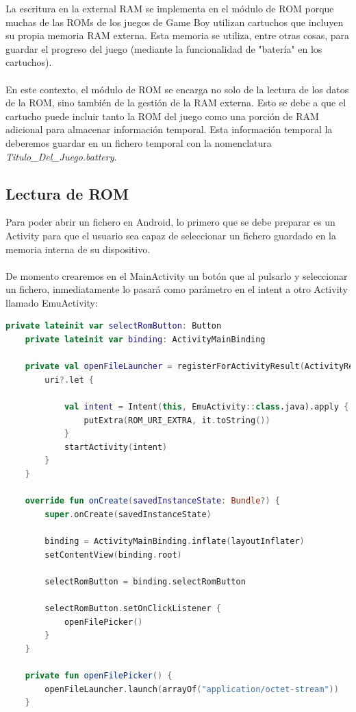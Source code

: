 La escritura en la external RAM se implementa en el módulo de ROM porque muchas de las ROMs de los juegos de Game Boy utilizan cartuchos que incluyen su propia memoria RAM externa. Esta memoria se utiliza, entre otras cosas, para guardar el progreso del juego (mediante la funcionalidad de "batería" en los cartuchos).
\\\\
En este contexto, el módulo de ROM se encarga no solo de la lectura de los datos de la ROM, sino también de la gestión de la RAM externa. Esto se debe a que el cartucho puede incluir tanto la ROM del juego como una porción de RAM adicional para almacenar información temporal. Esta información temporal la deberemos guardar en un fichero temporal con la nomenclatura \textit{Titulo\_Del\_Juego.battery}.

\subsection{Lectura de ROM}

Para poder abrir un fichero en Android, lo primero que se debe preparar es un Activity para que el usuario sea capaz de seleccionar un fichero guardado en la memoria interna de su dispositivo.
\\\\
De momento crearemos en el MainActivity un botón que al pulsarlo y seleccionar un fichero, inmediatamente lo pasará como parámetro en el intent a otro Activity llamado EmuActivity:

\begin{lstlisting}[language=Kotlin, caption={Abrir archivos binarios en un Activity}, label={code:kotlinopenfile}]
    private lateinit var selectRomButton: Button
    private lateinit var binding: ActivityMainBinding

    private val openFileLauncher = registerForActivityResult(ActivityResultContracts.OpenDocument()) { uri ->
        uri?.let {

            val intent = Intent(this, EmuActivity::class.java).apply {
                putExtra(ROM_URI_EXTRA, it.toString())
            }
            startActivity(intent)
        }
    }

    override fun onCreate(savedInstanceState: Bundle?) {
        super.onCreate(savedInstanceState)

        binding = ActivityMainBinding.inflate(layoutInflater)
        setContentView(binding.root)

        selectRomButton = binding.selectRomButton

        selectRomButton.setOnClickListener {
            openFilePicker()
        }
    }

    private fun openFilePicker() {
        openFileLauncher.launch(arrayOf("application/octet-stream"))
    }
\end{lstlisting}

